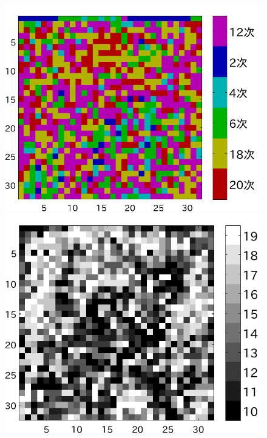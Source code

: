\documentclass[25pt, landscape,dvipdfmx]{foils}
\begin{document}
\begin{figure}[b]
\begin{flushleft}
\vspace{-1cm}
\includegraphics[angle=-90,scale=0.75]{fig/test1/l16/yosokusikino.pdf}
\includegraphics[angle=-90,scale=0.75]{fig/test1/l16/yosokusikihaba.pdf}

\end{flushleft}
\end{figure}
\end{document}
